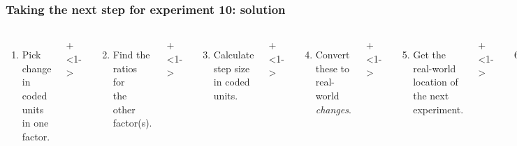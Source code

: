 \documentclass[handout,11pt,aspectratio=169,mathserif]{beamer}
\begin{document}
\begin{frame}\frametitle{Taking the next step for experiment 10: {\color{myOrange}solution}}
	\begin{columns}[T]
		
			\vspace{0.1cm}
			{\tiny 
				\begin{enumerate}
					\item	Pick change in coded units in one factor.
				\end{enumerate}
			 \par}
			 
			\onslide+<1->{
				{\tiny 
					\begin{enumerate}\setcounter{enumi}{1}
						\item	Find the ratios for\\ the other factor(s).
					\end{enumerate}
				
				\par}
			}
			
			\vspace{0.0cm}
			\onslide+<1->{
				{\tiny 
					\begin{enumerate}\setcounter{enumi}{2}
						\item	Calculate step size in coded units.
					\end{enumerate}
				
				\par}
			}
			
			\onslide+<1->{
				{\tiny 
					\begin{enumerate}\setcounter{enumi}{3}
						\item	Convert these to real-world \emph{changes}.
					\end{enumerate}
				
				\par}
			}
			
			\onslide+<1->{
				{\tiny 
					\begin{enumerate}\setcounter{enumi}{4}
						\item	Get the real-world location
						of the next experiment.
					\end{enumerate}
				
				\par}
			}
			
			
			\vspace{-0.2cm}
			\onslide+<1->{
				{\tiny 
					\begin{enumerate}\setcounter{enumi}{5}
						\item	Convert these back\\ to coded-units.
					\end{enumerate}
				
}}
\end{columns}
\end{frame}
\end{document}
